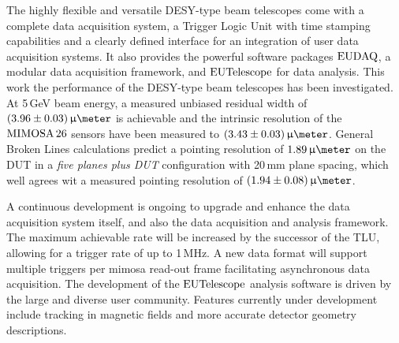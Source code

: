 

The highly flexible and versatile DESY-type beam telescopes come with a complete data acquisition system, a Trigger Logic Unit with time stamping capabilities
 and a clearly defined interface for an integration of user data acquisition systems.
It also provides the powerful software packages $\textrm{EUDAQ}$, a modular data acquisition framework, and $\textrm{EUTelescope}$ for data analysis. 
This work the performance of the  DESY-type beam telescopes has been investigated. 
At 5\,GeV beam energy, a measured unbiased residual width of $(3.96 \pm 0.03)\,\upmu\meter$ is achievable
 and the intrinsic resolution of the $\textrm{MIMOSA\,26}$ sensors have been measured to $(3.43 \pm 0.03)\,\upmu\meter$.
General Broken Lines calculations predict a pointing resolution of $1.89\,\upmu\meter$ on the DUT in a \textit{five planes plus DUT} configuration with 20\,mm plane spacing,
 which well agrees wit a measured pointing resolution of $(1.94 \pm 0.08)\,\upmu\meter$.

A continuous development is ongoing to upgrade and enhance the data acquisition system itself, and also the data acquisition and analysis framework.  
The maximum achievable rate will be increased by the successor of the TLU, allowing for a trigger rate of up to 1\,MHz.
 A new data format will support multiple triggers per mimosa read-out frame facilitating asynchronous data acquisition. 
The development of the $\textrm{EUTelescope}$ analysis software is driven by the large and diverse user community. 
Features currently under development include tracking in magnetic fields and more accurate detector geometry descriptions. 

